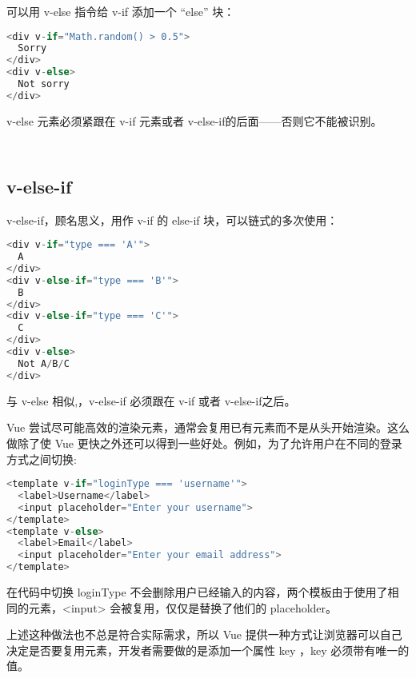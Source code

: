 可以用 v-else 指令给 v-if 添加一个 “else” 块：


\begin{lstlisting}[language=JavaScript]
<div v-if="Math.random() > 0.5">
  Sorry
</div>
<div v-else>
  Not sorry
</div>
\end{lstlisting}

v-else 元素必须紧跟在 v-if 元素或者 v-else-if的后面——否则它不能被识别。

\begin{lstlisting}[language=JavaScript]

\end{lstlisting}



\begin{lstlisting}[language=JavaScript]

\end{lstlisting}


\subsection{v-else-if}

v-else-if，顾名思义，用作 v-if 的 else-if 块，可以链式的多次使用：

\begin{lstlisting}[language=JavaScript]
<div v-if="type === 'A'">
  A
</div>
<div v-else-if="type === 'B'">
  B
</div>
<div v-else-if="type === 'C'">
  C
</div>
<div v-else>
  Not A/B/C
</div>
\end{lstlisting}

与 v-else 相似,，v-else-if 必须跟在 v-if 或者 v-else-if之后。


Vue 尝试尽可能高效的渲染元素，通常会复用已有元素而不是从头开始渲染。这么做除了使 Vue 更快之外还可以得到一些好处。例如，为了允许用户在不同的登录方式之间切换:



\begin{lstlisting}[language=JavaScript]
<template v-if="loginType === 'username'">
  <label>Username</label>
  <input placeholder="Enter your username">
</template>
<template v-else>
  <label>Email</label>
  <input placeholder="Enter your email address">
</template>
\end{lstlisting}

在代码中切换 loginType 不会删除用户已经输入的内容，两个模板由于使用了相同的元素，<input> 会被复用，仅仅是替换了他们的 placeholder。

上述这种做法也不总是符合实际需求，所以 Vue 提供一种方式让浏览器可以自己决定是否要复用元素，开发者需要做的是添加一个属性 key ，key 必须带有唯一的值。

